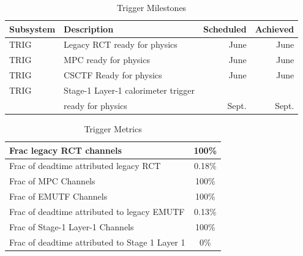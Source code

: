 \begin{table}[h]
\caption{Trigger Milestones }
\begin{center}
\begin{tabular}{|l|l|r|r|}
\hline
Subsystem&Description&Scheduled&Achieved\\
\hline
TRIG&Legacy RCT ready for physics&June &June\\
\hline
TRIG&MPC ready for physics&June &June\\
\hline
TRIG&CSCTF Ready for physics&June & June\\
\hline
TRIG& Stage-1 Layer-1 calorimeter trigger&&\\
& ready for physics &Sept.& Sept.\\
\hline
\end{tabular}
\end{center}
\label{TriggerMilestones}
\end{table}%

\begin{table}[htp]
\caption{Trigger Metrics}
\begin{center}
\begin{tabular}{|l|c|}
\hline
 Frac legacy RCT channels & 100\%  \\
\hline
Frac of deadtime attributed legacy RCT& 0.18\%\\
\hline
Frac of MPC Channels& 100\%\\
\hline
Frac of EMUTF Channels& 100\%\\
\hline
Frac of deadtime attributed to legacy EMUTF& 0.13\%\\
\hline
Frac of Stage-1 Layer-1 Channels & 100\%\\
\hline
Frac of deadtime attributed to Stage 1 Layer 1 & 0\%\\
\hline
\end{tabular}
\end{center}
\label{TriggerMetrics}
\end{table}%


